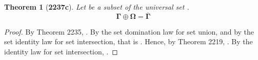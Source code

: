 \documentclass[preview]{standalone}
\newtheorem*{theorem*}{Theorem}
\begin{document}
\begin{theorem*}[\textbf{2237c}] \color{black}
    Let \bm{$\Gamma$} be a subset of the universal set \bm{$\Omega$}. 
    \begin{equation*}
        \bm{\Gamma \oplus \Omega = \overline{\Gamma}}
    \end{equation*}
\end{theorem*}
\begin{proof} \color{black}
    By Theorem 2235, 
    \bm{$
    \Gamma \oplus \Omega
        = 
    \big \langle \Gamma \cup \Omega \big \rangle
        - 
    \big \langle \Gamma \cap \Omega \big \rangle
    $}. 
    By the set domination law for set union, and by the set 
    identity law for set intersection, that is \bm{$\Omega - \Gamma$}. 
    Hence, by Theorem 2219, 
    \bm{$\Omega \cap \overline{\Gamma}$}.
    By the identity law for set intersection,
    \bm{$\Gamma \oplus \Omega = \overline{\Gamma}$}.
\color{lightgray} \end{proof}
\end{document}
